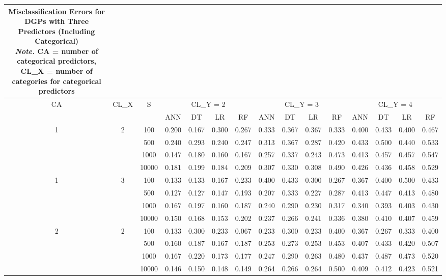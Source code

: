 \documentclass[12pt]{article}
\begin{document}
{\small
\setlength{\tabcolsep}{3pt}
\renewcommand{\arraystretch}{1}
\begin{longtable}{ccccccccccccccc}
    \caption{\normalsize{Misclassification Errors for DGPs with Three Predictors (Including Categorical) \\
         \textit{Note.} CA = number of categorical predictors, CL\_X = number of categories for categorical predictors}} \\
    \hline
    CA & CL\_X & S & \multicolumn{4}{c}{CL\_Y = 2} & \multicolumn{4}{c}{CL\_Y = 3} & \multicolumn{4}{c}{CL\_Y = 4} \\
    \cline{4-15}
    & & & ANN & DT & LR & RF & ANN & DT & LR & RF & ANN & DT & LR & RF \\
    \hline
    1 & 2 & 100 & 0.200 & 0.167 & 0.300 & 0.267 & 0.333 & 0.367 & 0.367 & 0.333 & 0.400 & 0.433 & 0.400 & 0.467 \\
      &   & 500 & 0.240 & 0.293 & 0.240 & 0.247 & 0.313 & 0.367 & 0.287 & 0.420 & 0.433 & 0.500 & 0.440 & 0.533 \\
      &   & 1000 & 0.147 & 0.180 & 0.160 & 0.167 & 0.257 & 0.337 & 0.243 & 0.473 & 0.413 & 0.457 & 0.457 & 0.547 \\
      &   & 10000 & 0.181 & 0.199 & 0.184 & 0.209 & 0.307 & 0.330 & 0.308 & 0.490 & 0.426 & 0.436 & 0.458 & 0.529 \\
    \hline
    1 & 3 & 100 & 0.133 & 0.133 & 0.167 & 0.233 & 0.400 & 0.433 & 0.300 & 0.267 & 0.367 & 0.400 & 0.500 & 0.433 \\
      &   & 500 & 0.127 & 0.127 & 0.147 & 0.193 & 0.207 & 0.333 & 0.227 & 0.287 & 0.413 & 0.447 & 0.413 & 0.480 \\
      &   & 1000 & 0.167 & 0.197 & 0.160 & 0.187 & 0.240 & 0.290 & 0.230 & 0.317 & 0.340 & 0.393 & 0.403 & 0.430 \\
      &   & 10000 & 0.150 & 0.168 & 0.153 & 0.202 & 0.237 & 0.266 & 0.241 & 0.336 & 0.380 & 0.410 & 0.407 & 0.459 \\
    \hline
    2 & 2 & 100 & 0.133 & 0.300 & 0.233 & 0.067 & 0.233 & 0.300 & 0.233 & 0.400 & 0.367 & 0.267 & 0.333 & 0.400 \\
      &   & 500 & 0.160 & 0.187 & 0.167 & 0.187 & 0.253 & 0.273 & 0.253 & 0.453 & 0.407 & 0.433 & 0.420 & 0.507 \\
      &   & 1000 & 0.167 & 0.220 & 0.173 & 0.177 & 0.247 & 0.290 & 0.263 & 0.480 & 0.437 & 0.487 & 0.473 & 0.520 \\
      &   & 10000 & 0.146 & 0.150 & 0.148 & 0.149 & 0.264 & 0.266 & 0.264 & 0.500 & 0.409 & 0.412 & 0.423 & 0.521 \\

\end{longtable}}
\end{document}
